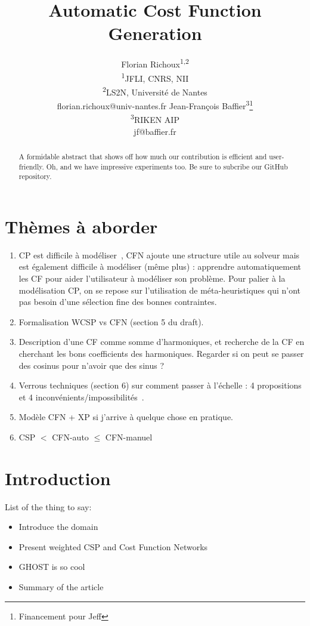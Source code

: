 \documentclass[letterpaper]{article} %
\title{Automatic Cost Function Generation}
\author{Florian Richoux\textsuperscript{\rm 1,2}\\
  \textsuperscript{\rm 1}JFLI, CNRS, NII\\
  \textsuperscript{\rm 2}LS2N, Université de Nantes\\
florian.richoux@univ-nantes.fr %
\And Jean-Fran\c{c}ois Baffier\textsuperscript{\rm 3}\thanks{Financement pour Jeff}\\
\textsuperscript{\rm 3}RIKEN AIP\\
jf@baffier.fr %
}
\begin{document}
\maketitle

\begin{abstract}
A formidable abstract that shows off how much our contribution is efficient and user-friendly. Oh, and we have impressive experiments too. Be sure to subcribe our GitHub repository.
\end{abstract}

\section{Thèmes à aborder}

\begin{enumerate}
\item CP est difficile à modéliser~\cite{Puget2004,Wallace2003}, CFN ajoute une structure utile au
  solveur  mais est  également  difficile à  modéliser  (même plus)  :
  apprendre  automatiquement   les  CF  pour  aider   l'utilisateur  à
  modéliser  son problème.  Pour palier  à la  modélisation CP,  on se
  repose sur  l'utilisation de méta-heuristiques qui  n'ont pas besoin
  d'une sélection fine des bonnes contraintes. \cite{AMJFH2011,Bessiere2015}
\item     Formalisation    WCSP     vs    CFN     (section    5     du
  draft). \cite{Bessiere2011,LK2014}
\item Description d'une CF comme  somme d'harmoniques, et recherche de
  la CF en  cherchant les bons coefficients  des harmoniques. Regarder
  si on peut se passer des cosinus pour n'avoir que des sinus ?
\item Verrous techniques (section 6)  sur comment passer à l'échelle :
  4 propositions et 4 inconvénients/impossibilités~\cite{PR2005}.
\item Modèle CFN + XP si j'arrive à quelque chose en pratique. \cite{Hoos2005}
\item CSP $<$ CFN-auto $\leq$ CFN-manuel
\end{enumerate}

\section{Introduction}\label{sec:introduction}
List of the thing to say:
\begin{itemize}
  \item Introduce the domain
  \item Present weighted CSP and Cost Function Networks
  \item GHOST is so cool
  \item Summary of the article
\end{itemize}
\end{document}
